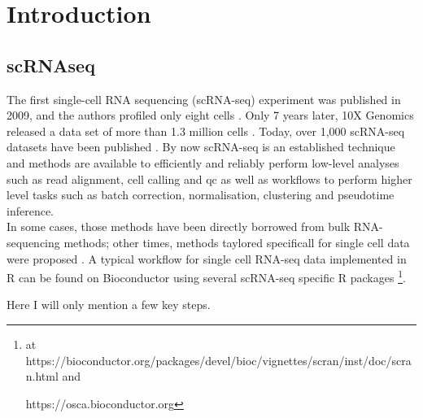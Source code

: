\newpage

\section{Introduction}

\subsection{scRNAseq}
\label{sec:scrnaseq}

The first single-cell RNA sequencing (scRNA-seq) experiment was published in 2009, and the authors profiled only eight cells \cite{tang2009mrna}. 
Only 7 years later, 10X Genomics released a data set of more than 1.3 million cells \cite{102016our}.
Today, over 1,000 scRNA-seq datasets have been published \cite{svensson2018exponential, svensson2019curated, svensson2020single}.
By now scRNA-seq is an established technique and methods are available to efficiently and reliably perform low-level analyses such as read alignment, cell calling and \gls{qc} as well as workflows to perform higher level tasks such as batch correction, normalisation, clustering and pseudotime inference.\\

In some cases, those methods have been directly borrowed from bulk RNA-sequencing methods; other times, methods taylored specificall for single cell data were proposed \cite{stegle2015computational}.
A typical workflow for single cell RNA-seq data implemented in R can be found on Bioconductor using several scRNA-seq specific R packages \cite{lun2016step, risso2016scrnaseq, mccarthy2017scater, lun2019singlecellexperiment}\footnote{at https://bioconductor.org/packages/devel/bioc/vignettes/scran/inst/doc/scran.html and

https://osca.bioconductor.org}.

Here I will only mention a few key steps.







